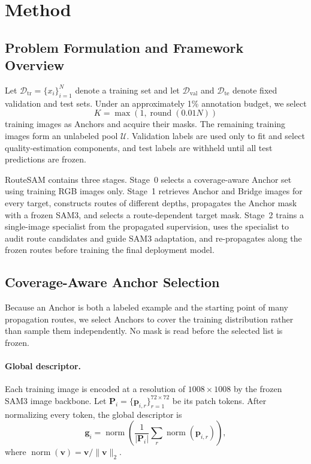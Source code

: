 \documentclass[a4paper,fleqn]{cas-dc}
\begin{document}
\section{Method}\label{sec:method}

\subsection{Problem Formulation and Framework Overview}

Let $\mathcal{D}_{\mathrm{tr}}=\{x_i\}_{i=1}^{N}$ denote a training set and let $\mathcal{D}_{\mathrm{val}}$ and $\mathcal{D}_{\mathrm{te}}$ denote fixed validation and test sets. Under an approximately 1\% annotation budget, we select
\begin{equation}
K=\max\left(1,\operatorname{round}(0.01N)\right)
\end{equation}
training images as Anchors and acquire their masks. The remaining training images form an unlabeled pool $\mathcal{U}$. Validation labels are used only to fit and select quality-estimation components, and test labels are withheld until all test predictions are frozen.

RouteSAM contains three stages. Stage~0 selects a coverage-aware Anchor set using training RGB images only. Stage~1 retrieves Anchor and Bridge images for every target, constructs routes of different depths, propagates the Anchor mask with a frozen SAM3, and selects a route-dependent target mask. Stage~2 trains a single-image specialist from the propagated supervision, uses the specialist to audit route candidates and guide SAM3 adaptation, and re-propagates along the frozen routes before training the final deployment model.

\subsection{Coverage-Aware Anchor Selection}\label{sec:anchor-selection}

Because an Anchor is both a labeled example and the starting point of many propagation routes, we select Anchors to cover the training distribution rather than sample them independently. No mask is read before the selected list is frozen.

\paragraph{Global descriptor.}
Each training image is encoded at a resolution of $1008 \times 1008$ by the frozen SAM3 image backbone. Let $\mathbf{P}_i=\{\mathbf{p}_{i,r}\}_{r=1}^{72\times72}$ be its patch tokens. After normalizing every token, the global descriptor is
\begin{equation}
\mathbf{g}_i=\operatorname{norm}\left(\frac{1}{|\mathbf{P}_i|}\sum_r
\operatorname{norm}(\mathbf{p}_{i,r})\right),
\end{equation}
where $\operatorname{norm}(\mathbf{v})=\mathbf{v}/\lVert\mathbf{v}\rVert_2$.
\end{document}

